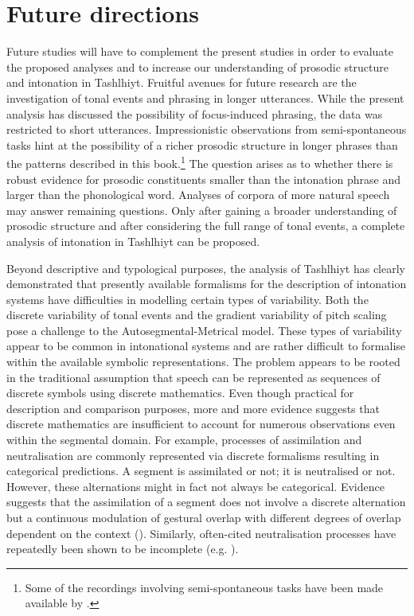 \section{Future directions}
Future studies will have to complement the present studies in order to evaluate the proposed analyses and to increase our understanding of prosodic structure and intonation in Tashlhiyt. Fruitful avenues for future research are the investigation of tonal events and phrasing in longer utterances. While the present analysis has discussed the possibility of focus-induced phrasing, the data was restricted to short utterances. Impressionistic observations from semi-spontaneous tasks hint at the possibility of a richer prosodic structure in longer phrases than the patterns described in this book.\footnote{Some of the recordings involving semi-spontaneous tasks have been made available by \cite{cotass}.} The question arises as to whether there is robust evidence for prosodic constituents smaller than the intonation phrase and larger than the phonological word. Analyses of corpora of more natural speech may answer remaining questions. Only after gaining a broader understanding of prosodic structure and after considering the full range of tonal events, a complete analysis of intonation in Tashlhiyt can be proposed. 

Beyond descriptive and typological purposes, the analysis of Tashlhiyt has clearly demonstrated that presently available formalisms for the description of intonation systems have difficulties in modelling certain types of variability. Both the discrete variability of tonal events and the gradient variability of pitch scaling pose a challenge to the Autosegmental-Metrical model. These types of variability appear to be common in intonational systems and are rather difficult to formalise within the available symbolic representations. The problem appears to be rooted in the traditional assumption that speech can be represented as sequences of discrete symbols using discrete mathematics. Even though practical for description and comparison purposes, more and more evidence suggests that discrete mathematics are insufficient to account for numerous observations even within the segmental domain. For example, processes of assimilation and neutralisation are commonly represented via discrete formalisms resulting in categorical predictions. A segment is assimilated or not; it is neutralised or not. However, these alternations might in fact not always be categorical. Evidence suggests that the assimilation of a segment does not involve a discrete alternation but a continuous modulation of gestural overlap with different degrees of overlap dependent on the context (\citealt{BrowmanGoldstein1986}). Similarly, often-cited neutralisation processes have repeatedly been shown to be incomplete (e.g. \citealt{PortODell1985,Roettger.etal2014}). 

